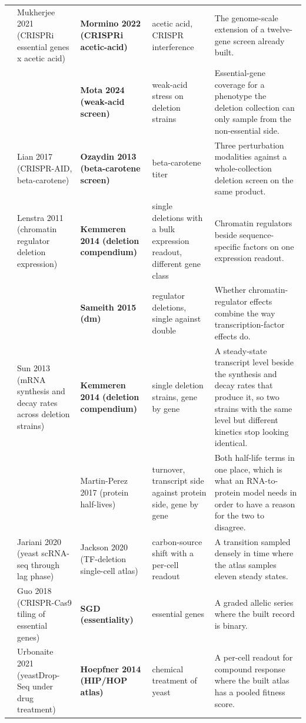 \begin{landscape}
\begin{longtable}{@{}r@{\hspace{4pt}} L{42mm} L{44mm} L{48mm} L{96mm}@{}}
 & Mukherjee 2021 (CRISPRi essential genes x acetic acid) & \textbf{Mormino 2022 (CRISPRi acetic-acid)} & acetic acid, CRISPR interference & The genome-scale extension of a twelve-gene screen already built. \\
 &  & \textbf{Mota 2024 (weak-acid screen)} & weak-acid stress on deletion strains & Essential-gene coverage for a phenotype the deletion collection can only sample from the non-essential side. \\
 & Lian 2017 (CRISPR-AID, beta-carotene) & \textbf{Ozaydin 2013 (beta-carotene screen)} & beta-carotene titer & Three perturbation modalities against a whole-collection deletion screen on the same product. \\
 & Lenstra 2011 (chromatin regulator deletion expression) & \textbf{Kemmeren 2014 (deletion compendium)} & single deletions with a bulk expression readout, different gene class & Chromatin regulators beside sequence-specific factors on one expression readout. \\
 &  & \textbf{Sameith 2015 (dm)} & regulator deletions, single against double & Whether chromatin-regulator effects combine the way transcription-factor effects do. \\
 & Sun 2013 (mRNA synthesis and decay rates across deletion strains) & \textbf{Kemmeren 2014 (deletion compendium)} & single deletion strains, gene by gene & A steady-state transcript level beside the synthesis and decay rates that produce it, so two strains with the same level but different kinetics stop looking identical. \\
 &  & Martin-Perez 2017 (protein half-lives) & turnover, transcript side against protein side, gene by gene & Both half-life terms in one place, which is what an RNA-to-protein model needs in order to have a reason for the two to disagree. \\
 & Jariani 2020 (yeast scRNA-seq through lag phase) & Jackson 2020 (TF-deletion single-cell atlas) & carbon-source shift with a per-cell readout & A transition sampled densely in time where the atlas samples eleven steady states. \\
 & Guo 2018 (CRISPR-Cas9 tiling of essential genes) & \textbf{SGD (essentiality)} & essential genes & A graded allelic series where the built record is binary. \\
 & Urbonaite 2021 (yeastDrop-Seq under drug treatment) & \textbf{Hoepfner 2014 (HIP/HOP atlas)} & chemical treatment of yeast & A per-cell readout for compound response where the built atlas has a pooled fitness score. \\

\end{longtable}
\end{landscape}
